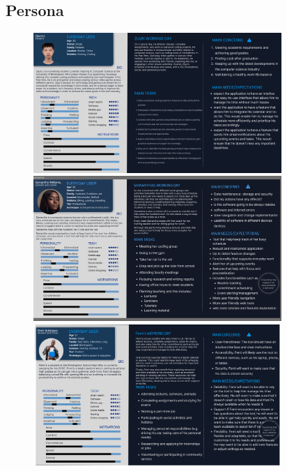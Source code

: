 \documentclass[a4paper]{article}
\begin{document}
{\newpage
\subsection{Persona}

\begin{figure}[H] %
	\centering %
	\includegraphics[width=0.84\textwidth]{./images/Persona_Zijun.jpg} %
	\includegraphics[width=0.84\textwidth]{./images/Persona_Chance.jpg}
	\includegraphics[width=0.84\textwidth]{./images/Persona_Samuel.jpg}
	\caption*{} %
	\label{Fig.Personas1} %
\end{figure}

}
\end{document}
